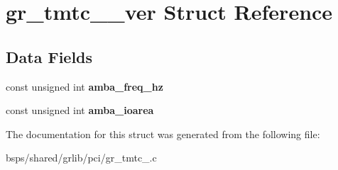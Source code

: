 \hypertarget{structgr__tmtc__1553__ver}{}\section{gr\+\_\+tmtc\+\_\+\_\+ver Struct Reference}
\label{structgr__tmtc__1553__ver}
\subsection*{Data Fields}
\begin{DoxyCompactItemize}
\item 
\mbox{\label{structgr__tmtc__1553__ver_a2e6956b205b5b563978855d00830fec6}} 
const unsigned int {\bfseries amba\+\_\+freq\+\_\+hz}
\item 
\mbox{\label{structgr__tmtc__1553__ver_a0a8aee1bd171ce770053ef9122e2adf7}} 
const unsigned int {\bfseries amba\+\_\+ioarea}
\end{DoxyCompactItemize}


The documentation for this struct was generated from the following file\+:\begin{DoxyCompactItemize}
\item 
bsps/shared/grlib/pci/gr\+\_\+tmtc\+\_.\+c\end{DoxyCompactItemize}
